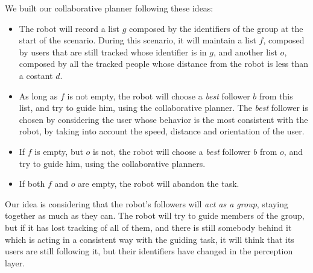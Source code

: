 We built our collaborative planner following these ideas:
\begin{itemize}
\item The robot will record a list $g$ composed by the identifiers of the group at the start of the scenario. During this scenario, it will maintain a list $f$, composed by users that are still tracked whose identifier is in $g$, and another list $o$, composed by all the tracked people whose distance from the robot is less than a costant $d$. 
\item As long as $f$ is not empty, the robot will choose a \textit{best} follower $b$ from this list, and try to guide him, using the collaborative planner. The \textit{best} follower is chosen by considering the user whose behavior is the most consistent with the robot, by taking into account the speed, distance and orientation of the user.
\item If $f$ is empty, but $o$ is not, the robot will choose a \textit{best} follower $b$ from $o$, and try to guide him, using the collaborative planners.
\item If  both $f$ and $o$ are empty, the robot will abandon the task.
\end{itemize}

Our idea is considering that the robot's followers will \textit{act as a group}, staying together as much as they can. The robot will try to guide members of the group, but if it has lost tracking of all of them, and there is still somebody behind it which is acting in a consistent way with the guiding task, it will think that its users are still following it, but their identifiers have changed in the perception layer.


